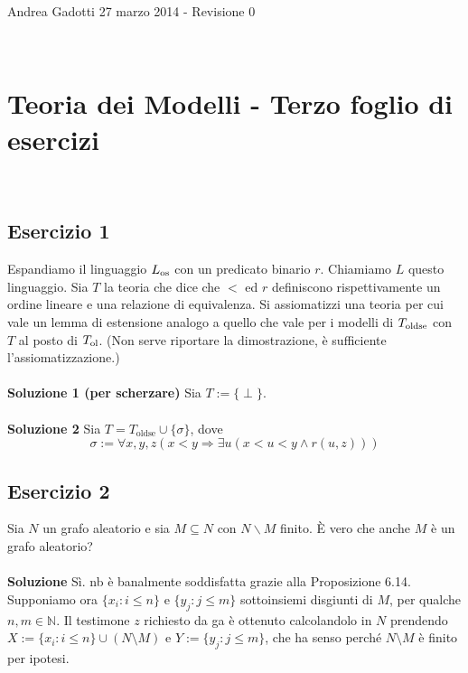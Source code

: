 \documentclass[10pt,a4paper]{article}
\def\sm{\smallsetminus}
\def\ssf#1{\textsf{\small #1}}
\begin{document}
\noindent Andrea Gadotti \hfill 27 marzo 2014 - Revisione 0 

\

\section*{Teoria dei Modelli - Terzo foglio di esercizi}

\

\subsection*{Esercizio 1}
Espandiamo il linguaggio $L_{\rm os}$ con un predicato binario $r$. Chiamiamo $L$ questo linguaggio. Sia $T$ la teoria che dice che $<$ ed $r$ definiscono rispettivamente un ordine lineare e una relazione di equivalenza. Si assiomatizzi una teoria per cui vale un lemma di estensione analogo a quello che vale per i modelli di $T_{\rm oldse}$ con $T$ al posto di $T_{\rm ol}$. (Non serve riportare la dimostrazione, è sufficiente l'assiomatizzazione.)\\
\\
\noindent\textbf{Soluzione 1 (per scherzare)} Sia $T:=\{\perp\}$.\\
\\
\noindent\textbf{Soluzione 2} Sia $T=T_{\text{oldse}}\cup\{\sigma\}$, dove 
$$\sigma:=\forall x,y,z (x<y \Rightarrow \exists u (x<u<y \wedge r(u,z)))$$


\subsection*{Esercizio 2}
Sia $N$ un grafo aleatorio e sia $M\subseteq N$ con $N\sm M$ finito. È vero che anche $M$ è un grafo aleatorio?\\
\\
\noindent\textbf{Soluzione} Sì. \ssf{nb} è banalmente soddisfatta grazie alla Proposizione 6.14. Supponiamo ora $\{x_i : i \leq n\}$ e $\{y_j : j \leq m\}$ sottoinsiemi disgiunti di $M$, per qualche $n,m \in \mathbb{N}$. Il testimone $z$ richiesto da \ssf{ga} è ottenuto calcolandolo in $N$ prendendo $X:=\{x_i : i \leq n\} \cup (N \setminus M)$ e $Y:=\{y_j : j \leq m\}$, che ha senso perché $N \setminus M$ è finito per ipotesi.
\end{document}
